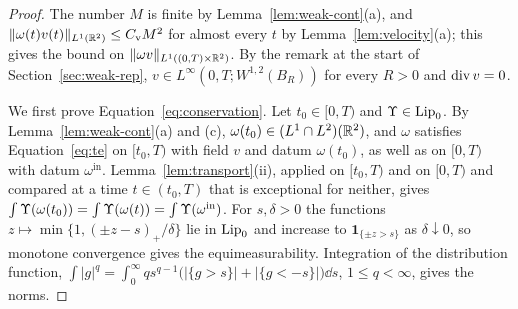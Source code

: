 \begin{proof}
The number $M$ is finite by Lemma~\ref{lem:weak-cont}(a), and
$\|\omega(t)v(t)\|_{L^1(\mathbb{R}^2)}\le C_{\mathrm v}M^2$ for almost every $t$ by
Lemma~\ref{lem:velocity}(a); this gives the bound on
$\|\omega v\|_{L^1((0,T)\times\mathbb{R}^2)}$. By the remark at the start of
Section~\ref{sec:weak-rep},
$v\in L^\infty(0,T;W^{1,2}(B_R))$ for every $R>0$ and $\operatorname{div} v=0$.

We first prove Equation~\eqref{eq:conservation}. Let $t_0\in[0,T)$ and
$\Upsilon\in\mathrm{Lip}_0$. By Lemma~\ref{lem:weak-cont}(a) and (c),
$\omega(t_0)\in (L^1\cap L^2)(\mathbb{R}^2)$, and $\omega$ satisfies Equation~\eqref{eq:te} on
$[t_0,T)$ with field $v$ and datum $\omega(t_0)$, as well as on $[0,T)$ with
datum $\omega^{\mathrm{in}}$. Lemma~\ref{lem:transport}(ii), applied on
$[t_0,T)$ and on $[0,T)$ and compared at a time $t\in(t_0,T)$ that is
exceptional for neither, gives
$\int\Upsilon(\omega(t_0))=\int\Upsilon(\omega(t))=\int\Upsilon(\omega^{\mathrm{in}})$. For
$s,\delta>0$ the functions $z\mapsto\min\{1,(\pm z-s)_+/\delta\}$ lie in
$\mathrm{Lip}_0$ and increase to $\mathbf 1_{\{\pm z>s\}}$ as $\delta\downarrow0$, so
monotone convergence gives the equimeasurability. Integration of the
distribution function, $\int|g|^q=\int_0^\infty qs^{q-1}\big(|\{g>s\}|+|\{g<-s\}|\big)\dd s$,
$1\le q<\infty$, gives the norms.


\end{proof}

